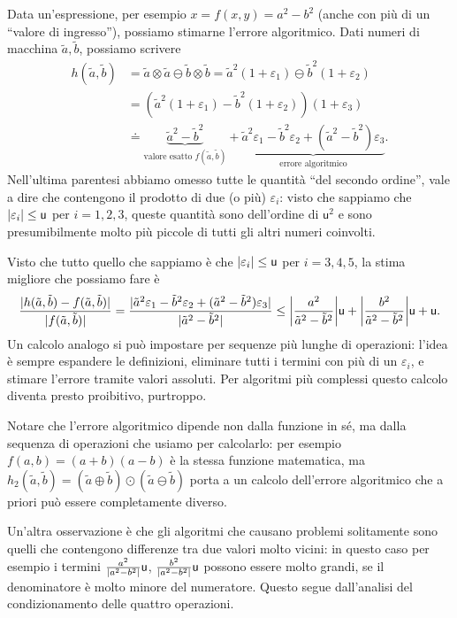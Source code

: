 \documentclass[a4paper]{report}
\DeclarePairedDelimiter{\abs}{\lvert}{\rvert}
\theoremstyle{definiton}
\theoremstyle{remark}
\begin{document}
Data un'espressione, per esempio $x = f(x,y) = a^2 - b^2$ (anche con più di un ``valore di ingresso''), possiamo stimarne l'errore algoritmico. Dati numeri di macchina $\tilde{a}, \tilde{b}$, possiamo scrivere
\begin{align*}
h(\tilde{a}, \tilde{b}) &= \tilde{a} \otimes \tilde{a} \ominus \tilde{b} \otimes \tilde{b} = \tilde{a}^2(1+\varepsilon_1) \ominus \tilde{b}^2(1+\varepsilon_2)\\
&= \left( \tilde{a}^2(1+\varepsilon_1) - \tilde{b}^2(1+\varepsilon_2) \right)(1+\varepsilon_3) \\
& \doteq \underbrace{\tilde{a}^2-\tilde{b}^2}_{\text{valore esatto $f(\tilde{a},\tilde{b})$}} {}+{} \underbrace{\tilde{a}^2\varepsilon_1 - \tilde{b}^2\varepsilon_2 + (\tilde{a}^2-\tilde{b}^2)\varepsilon_3}_{\text{errore algoritmico}}.
\end{align*}
Nell'ultima parentesi abbiamo omesso tutte le quantità ``del secondo ordine'', vale a dire che contengono il prodotto di due (o più) $\varepsilon_i$: visto che sappiamo che $\abs{\varepsilon_i} \leq \mathsf{u}$ per $i=1,2,3$, queste quantità sono dell'ordine di $\mathsf{u}^2$ e sono presumibilmente molto più piccole di tutti gli altri numeri coinvolti.


Visto che tutto quello che sappiamo è che $\abs{\varepsilon_i} \leq \mathsf{u}$ per $i=3,4,5$, la stima migliore che possiamo fare è
\[
\frac{\abs{h(\tilde{a},\tilde{b}) - f(\tilde{a},\tilde{b})}}{\abs{f(\tilde{a},\tilde{b})}} = \frac{\abs{\tilde{a}^2\varepsilon_1 - \tilde{b}^2\varepsilon_2 + (\tilde{a}^2-\tilde{b}^2)\varepsilon_3}}{\abs{\tilde{a}^2-\tilde{b}^2}} \leq \abs*{\frac{a^2}{\tilde{a}^2-\tilde{b}^2}}\mathsf{u} + \abs*{\frac{b^2}{\tilde{a}^2-\tilde{b}^2}}\mathsf{u} + \mathsf{u}.
\]
Un calcolo analogo si può impostare per sequenze più lunghe di operazioni: l'idea è sempre espandere le definizioni, eliminare tutti i termini con più di un $\varepsilon_i$, e stimare l'errore tramite valori assoluti. Per algoritmi più complessi questo calcolo diventa presto proibitivo, purtroppo.

Notare che l'errore algoritmico dipende non dalla funzione in sé, ma dalla sequenza di operazioni che usiamo per calcolarlo: per esempio $f(a,b) = (a+b)(a-b)$ è la stessa funzione matematica, ma $h_2(\tilde{a},\tilde{b}) = (\tilde{a} \oplus \tilde{b})\odot (\tilde{a}\ominus \tilde{b})$ porta a un calcolo dell'errore algoritmico che a priori può essere completamente diverso.

Un'altra osservazione è che gli algoritmi che causano problemi solitamente sono quelli che contengono differenze tra due valori molto vicini: in questo caso per esempio i termini $\frac{a^2}{\abs{a^2-b^2}}\mathsf{u}$, $\frac{b^2}{\abs{a^2-b^2}}\mathsf{u}$ possono essere molto grandi, se il denominatore è molto minore del numeratore. Questo segue dall'analisi del condizionamento delle quattro operazioni.
\end{document}
